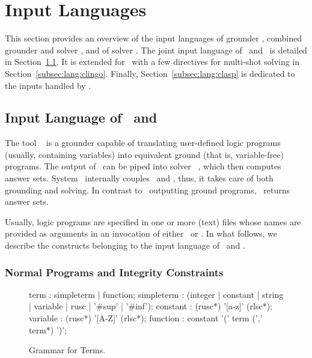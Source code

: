 \section{Input Languages}\label{sec:language}

This section provides an overview of the input languages of
grounder \gringo, combined grounder and solver \clingo, 
and of solver \clasp.
The joint input language of \gringo\ and \clingo\ is detailed in
Section~\ref{subsec:lang:gringo}.
It is extended for \clingo\ with a few directives for multi-shot solving in Section~\ref{subsec:lang:clingo}.
Finally, Section~\ref{subsec:lang:clasp} is dedicated to the inputs handled by \clasp.

\subsection{Input Language of \gringo\ and \clingo}\label{subsec:lang:gringo}

The tool \gringo~\cite{gescth07a} is a grounder capable of translating
user-defined logic programs (usually, containing variables) into 
equivalent ground (that is, variable-free) programs.
The output of \gringo\ can be piped into solver \clasp~\cite{gekanesc07a,gekasc09c},
which then computes answer sets.
System \clingo\ internally couples \gringo\ and \clasp, thus,
it takes care of both grounding and solving.
In contrast to \gringo\ outputting ground programs, 
\clingo\ returns answer sets.

Usually, logic programs are specified in one or more (text) files whose names are
provided as arguments
in an invocation of either \gringo\ or \clingo.
In what follows, we describe the 
constructs belonging to the input language of \gringo\ and \clingo.

\subsubsection{Normal Programs and Integrity Constraints}\label{subsec:gringo:normal}

\begin{figure}
\vspace*{-19mm}
\railnontermfont{\rmfamily\itshape}%
\begin{rail}
	term        : simpleterm | function;
	simpleterm  : (integer | constant | string | variable | rusc | '\#sup' | '\#inf');
	constant    : (rusc*) '[a-z]' (rlsc*);
	variable    : (rusc*) '[A-Z]' (rlsc*);
	function    : constant '(' term (',' term*) ')';
\end{rail}
\caption{Grammar for Terms.\label{fig:terms}}
\end{figure}

